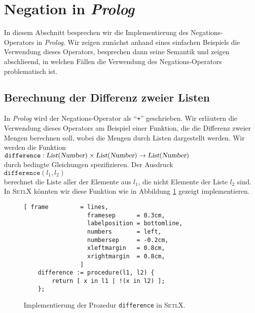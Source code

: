\section{Negation in \textsl{Prolog}}
In diesem Abschnitt besprechen wir die Implementierung des Negations-Operators in
\textsl{Prolog}.  Wir zeigen zun\"{a}chst anhand eines einfachen Beispiels die Verwendung
dieses Operators, besprechen dann seine Semantik und zeigen abschlie\3end, in welchen
F\"{a}llen die Verwendung des Negations-Operators problematisch ist.

\subsection{Berechnung der Differenz zweier Listen}
In \textsl{Prolog} wird der Negations-Operator als ``\texttt{+}'' geschrieben.
Wir erl\"{a}utern die Verwendung dieses 
Operators am Beispiel einer Funktion, die die Differenz zweier Mengen berechnen soll,
wobei die Mengen durch Listen dargestellt werden.  Wir werden  die Funktion \\[0.1cm]
\hspace*{1.3cm} 
$\texttt{difference}: \textsl{List}(\textsl{Number}) \times \textsl{List}(\textsl{Number}) \rightarrow \textsl{List}(\textsl{Number})$
\\[0.1cm]
durch bedingte Gleichungen spezifizieren.  Der Ausdruck \\[0.1cm]
\hspace*{1.3cm} $\mathtt{difference}(l_1,l_2)$ \\[0.1cm]
berechnet die Liste aller der Elemente aus $l_1$, die nicht Elemente der Liste $l_2$ sind.
In \textsc{SetlX} k\"{o}nnten wir diese Funktion wie in Abbildung \ref{fig:difference.stl}
gezeigt implementieren.
\begin{figure}[!ht]
\centering
\begin{Verbatim}[ frame         = lines, 
                  framesep      = 0.3cm, 
                  labelposition = bottomline,
                  numbers       = left,
                  numbersep     = -0.2cm,
                  xleftmargin   = 0.8cm,
                  xrightmargin  = 0.8cm,
                ]
    difference := procedure(l1, l2) {
        return [ x in l1 | !(x in l2) ];
    };
\end{Verbatim}
\vspace*{-0.3cm}
\caption{Implementierung der Prozedur \texttt{difference} in \textsc{SetlX}.}
\label{fig:difference.stl}
\end{figure}

